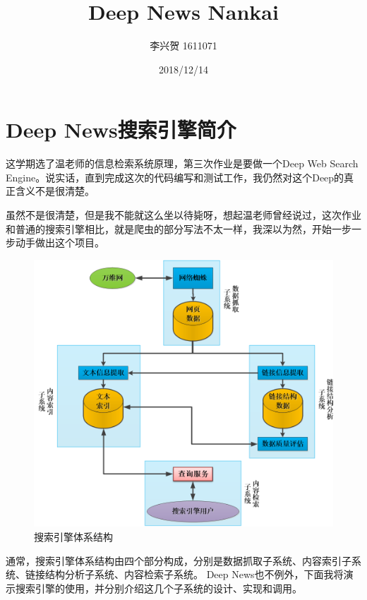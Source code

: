 \documentclass[12pt]{article}
\title{Deep News Nankai}
\author{李兴贺 1611071}
\date{2018/12/14}
\begin{document}
		
		
		
		\maketitle
		
		\newpage
		
		
		\tableofcontents
		
		\newpage
		
		
		\section{Deep News搜索引擎简介}
		
		这学期选了温老师的信息检索系统原理，第三次作业是要做一个Deep Web Search Engine。说实话，直到完成这次的代码编写和测试工作，我仍然对这个Deep的真正含义不是很清楚。
		
		虽然不是很清楚，但是我不能就这么坐以待毙呀，想起温老师曾经说过，这次作业和普通的搜索引擎相比，就是爬虫的部分写法不太一样，我深以为然，开始一步一步动手做出这个项目。
		
		
		
		
		
		\begin{figure}[htb]
			\centering
			\includegraphics[width=0.5\linewidth]{screenshot001}
			\caption[搜索引擎体系结构]{搜索引擎体系结构}
			\label{搜索引擎体系结构}
		\end{figure}
		
		通常，搜索引擎体系结构由四个部分构成，分别是数据抓取子系统、内容索引子系统、链接结构分析子系统、内容检索子系统。
		Deep News也不例外，下面我将演示搜索引擎的使用，并分别介绍这几个子系统的设计、实现和调用。
		
\end{document}
